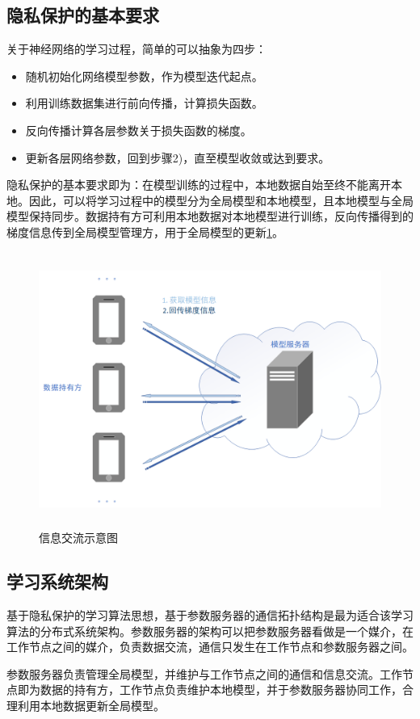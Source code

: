 \documentclass[zihao = -4,cn]{oucart}
\begin{document}
\subsection{隐私保护的基本要求}
关于神经网络的学习过程，简单的可以抽象为四步：
\begin{itemize}
	\item [1)]
	随机初始化网络模型参数，作为模型迭代起点。
	\item [2)]
	利用训练数据集进行前向传播，计算损失函数。
	\item [3)]
	反向传播计算各层参数关于损失函数的梯度。
	\item [4)]
	更新各层网络参数，回到步骤2)，直至模型收敛或达到要求。
\end{itemize}
\par
隐私保护的基本要求即为：在模型训练的过程中，本地数据自始至终不能离开本地。因此，可以将学习过程中的模型分为全局模型和本地模型，且本地模型与全局模型保持同步。数据持有方可利用本地数据对本地模型进行训练，反向传播得到的梯度信息传到全局模型管理方，用于全局模型的更新\ref{fig:commu}。
\begin{figure}[h]
\centering %
\includegraphics[width=15cm,height=9cm]{assets/test}
\caption{信息交流示意图}
\label{fig:commu}
\end{figure}

\subsection{学习系统架构}
基于隐私保护的学习算法思想，基于参数服务器的通信拓扑结构是最为适合该学习算法的分布式系统架构。参数服务器的架构可以把参数服务器看做是一个媒介，在工作节点之间的媒介，负责数据交流，通信只发生在工作节点和参数服务器之间。\par
参数服务器负责管理全局模型，并维护与工作节点之间的通信和信息交流。工作节点即为数据的持有方，工作节点负责维护本地模型，并于参数服务器协同工作，合理利用本地数据更新全局模型。
\end{document}
